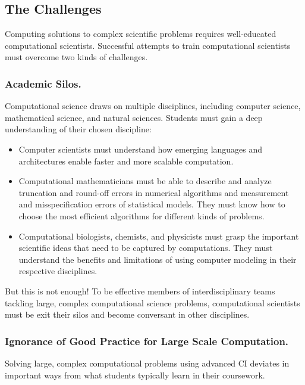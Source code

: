 \documentclass[11pt]{NSFamsart}
\begin{document}
\subsection*{The Challenges}
Computing solutions to complex scientific problems requires well-educated computational scientists.  Successful attempts to train computational scientists must overcome two kinds of challenges.

\subsubsection*{Academic Silos.} Computational science draws on multiple disciplines, including computer science, mathematical science, and natural sciences.  Students must gain a deep understanding of their chosen discipline:

\begin{itemize}
\item Computer scientists must understand how emerging languages and architectures enable faster and more scalable computation.  

\item Computational mathematicians must be able to describe and analyze truncation and round-off errors in numerical algorithms and measurement and misspecification errors of statistical models.  They must know how to choose the most efficient algorithms for different kinds of problems.

\item Computational biologists, chemists, and physicists must grasp the important scientific ideas that need to be captured by computations.  They must understand the benefits and limitations of using computer modeling in their respective disciplines.

\end{itemize}
But this is not enough!  To be effective members of interdisciplinary teams tackling large, complex computational science problems, computational scientists must be exit their silos and become conversant in other disciplines.

\subsubsection*{Ignorance of Good Practice for Large Scale Computation.}  Solving large, complex computational problems using advanced CI deviates in important ways from what students typically learn in their coursework. 
\end{document}
